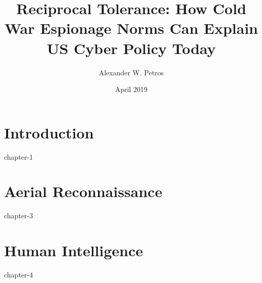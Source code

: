 \documentclass{report}
\title{Reciprocal Tolerance: How Cold War Espionage Norms Can Explain US Cyber Policy Today}
\author{Alexander W. Petros}
\date{April 2019}
\begin{document}
    \maketitle
    \tableofcontents
    \newpage

    \chapter{Introduction}
    {chapter-1}

    \chapter{Aerial Reconnaissance}
    {chapter-3}

    \chapter{Human Intelligence}
    {chapter-4}
\end{document}
